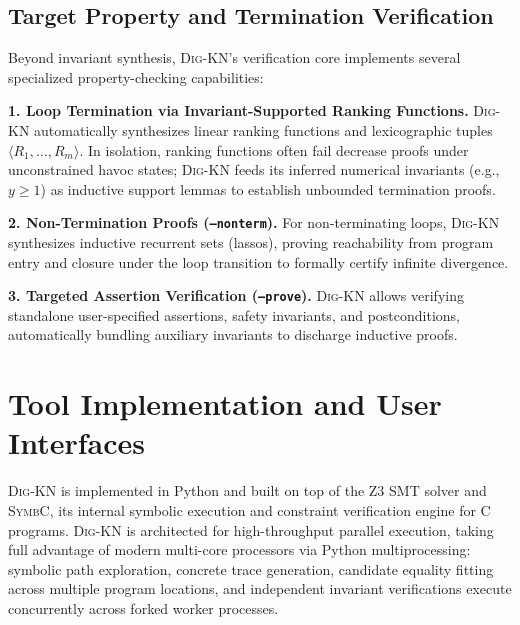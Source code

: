 \documentclass[runningheads]{llncs}
\newcommand{\tool}{\textsc{Dig-KN}\xspace}
\newcommand{\code}[1]{\texttt{\small #1}}
\begin{document}
\subsection{Target Property and Termination Verification}
\label{sec:additional_ver}

Beyond invariant synthesis, \tool{}'s verification core implements several specialized property-checking capabilities:

\medskip\noindent\textbf{1. Loop Termination via Invariant-Supported Ranking Functions.}
\tool{} automatically synthesizes linear ranking functions and lexicographic tuples $\langle R_1, \dots, R_m \rangle$. In isolation, ranking functions often fail decrease proofs under unconstrained havoc states; \tool{} feeds its inferred numerical invariants (e.g., $y \ge 1$) as inductive support lemmas to establish unbounded termination proofs.

\medskip\noindent\textbf{2. Non-Termination Proofs (\code{--nonterm}).}
For non-terminating loops, \tool{} synthesizes inductive recurrent sets (lassos), proving reachability from program entry and closure under the loop transition to formally certify infinite divergence.

\medskip\noindent\textbf{3. Targeted Assertion Verification (\code{--prove}).}
\tool{} allows verifying standalone user-specified assertions, safety invariants, and postconditions, automatically bundling auxiliary invariants to discharge inductive proofs.

\section{Tool Implementation and User Interfaces}
\label{sec:features}

\tool{} is implemented in Python and built on top of the Z3 SMT solver and \textsc{SymbC}, its internal symbolic execution and constraint verification engine for C programs.  \tool{} is architected for high-throughput parallel execution, taking full advantage of modern multi-core processors via Python multiprocessing: symbolic path exploration, concrete trace generation, candidate equality fitting across multiple program locations, and independent invariant verifications execute concurrently across forked worker processes.
\end{document}
